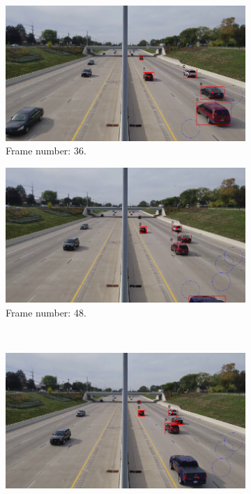 \begin{figure}[H]
    \centering
    \begin{subfigure}{0.48\textwidth}
        \centering
        \includegraphics[width=\linewidth]{../../../experiments/E1/V1/SAM/36}
        \caption{Frame number: 36.}
        \label{fig:E1-V1-S2:01}
    \end{subfigure}
    \begin{subfigure}{0.48\textwidth}
        \centering
        \includegraphics[width=\linewidth]{../../../experiments/E1/V1/SAM/48}
        \caption{Frame number: 48.}
        \label{fig:E1-V1-S2:02}
    \end{subfigure}
    \\
    \begin{subfigure}{0.48\textwidth}
        \centering
        \includegraphics[width=\linewidth]{../../../experiments/E1/V1/SAM/53}

\end{subfigure}
\end{figure}
